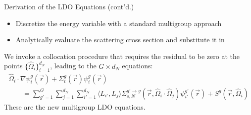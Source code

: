 \documentclass[xcolor=x11names,compress]{beamer}
\renewcommand{\(}{\begin{columns}}
\renewcommand{\)}{\end{columns}}
\newcommand{\<}[1]{\begin{column}{#1}}
\renewcommand{\>}{\end{column}}
\newcommand{\vOmega}{\ensuremath{\hat{\Omega}}}
\newcommand{\vecr}{\vec{r}}
\newcommand{\sigt}{\Sigma_t}
\newcommand{\sigs}{\Sigma_s}
\newcommand{\maths}{\mathbb{S}^2}
\newcommand{\dn}{d_N}
\begin{document}
\begin{frame}[label=group_disc]{Derivation of the LDO Equations (cont'd.)}
\begin{itemize}
\item Discretize the energy variable with a standard multigroup approach
\pause
\item Analytically evaluate the scattering cross section and substitute it in%
\end{itemize}
\pause
We invoke a collocation procedure that requires the residual to be zero at the points 
$\{\vOmega_i\}_{i=1}^{\dn}$, leading to the $G\times\dn$ equations:
\begin{multline}
\vOmega_i\cdot\nabla\psi_i^g(\vecr) + \Sigma_t^g(\vecr)\psi_i^g(\vecr) \\ \qquad= 
\sum_{g'=1}^{G}\sum_{j=1}^{\dn}\sum_{i'=1}^{\dn}\langle L_{i'},L_j\rangle\Sigma_{s,N}^{g'\rightarrow g}(\vecr,\vOmega_i\cdot\vOmega_j)\psi_{i'}^{g'}(\vecr) + S^g(\vecr,\vOmega_i)%
\end{multline}
These are the new multigroup LDO equations.
\end{frame}
\end{document}

